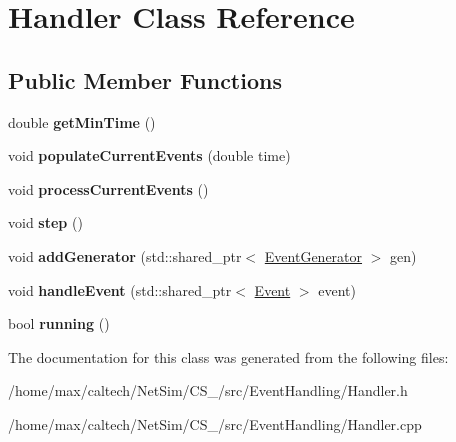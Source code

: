 \hypertarget{classHandler}{\section{\-Handler \-Class \-Reference}
\label{classHandler}
}
\subsection*{\-Public \-Member \-Functions}
\begin{DoxyCompactItemize}
\item 
\hypertarget{classHandler_aa93dcd4a5dc2d1e2f10cec2ebe3a9668}{double {\bfseries get\-Min\-Time} ()}\label{classHandler_aa93dcd4a5dc2d1e2f10cec2ebe3a9668}

\item 
\hypertarget{classHandler_abc28c961d70d462106f2f3be46330930}{void {\bfseries populate\-Current\-Events} (double time)}\label{classHandler_abc28c961d70d462106f2f3be46330930}

\item 
\hypertarget{classHandler_ad67c5bf3357aba8c6b71fa76c5161d29}{void {\bfseries process\-Current\-Events} ()}\label{classHandler_ad67c5bf3357aba8c6b71fa76c5161d29}

\item 
\hypertarget{classHandler_aa60626b419730f48a1bd5b91c9ade9d7}{void {\bfseries step} ()}\label{classHandler_aa60626b419730f48a1bd5b91c9ade9d7}

\item 
\hypertarget{classHandler_a6d66a0dfe17658e9ba92080d506654ac}{void {\bfseries add\-Generator} (std\-::shared\-\_\-ptr$<$ \hyperlink{classEventGenerator}{\-Event\-Generator} $>$ gen)}\label{classHandler_a6d66a0dfe17658e9ba92080d506654ac}

\item 
\hypertarget{classHandler_a1f9bd53a9251f712c6ff20ca48122e6f}{void {\bfseries handle\-Event} (std\-::shared\-\_\-ptr$<$ \hyperlink{classEvent}{\-Event} $>$ event)}\label{classHandler_a1f9bd53a9251f712c6ff20ca48122e6f}

\item 
\hypertarget{classHandler_a4639718d2f590ebd22d0d949a239327d}{bool {\bfseries running} ()}\label{classHandler_a4639718d2f590ebd22d0d949a239327d}

\end{DoxyCompactItemize}


\-The documentation for this class was generated from the following files\-:\begin{DoxyCompactItemize}
\item 
/home/max/caltech/\-Net\-Sim/\-C\-S\-\_/src/\-Event\-Handling/\-Handler.\-h\item 
/home/max/caltech/\-Net\-Sim/\-C\-S\-\_/src/\-Event\-Handling/\-Handler.\-cpp\end{DoxyCompactItemize}
